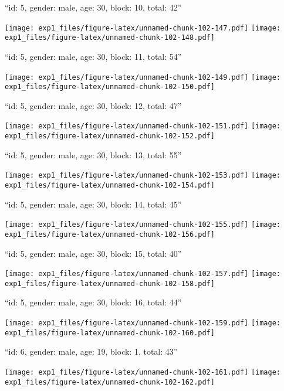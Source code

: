 \documentclass[11pt,,]{article}
\begin{document}
\newpage
[1] 

``id: 5, gender: male, age: 30, block: 10, total: 42''

\texttt{[image: exp1\_files/figure-latex/unnamed-chunk-102-147.pdf]}
\texttt{[image: exp1\_files/figure-latex/unnamed-chunk-102-148.pdf]}

\newpage
[1] 

``id: 5, gender: male, age: 30, block: 11, total: 54''

\texttt{[image: exp1\_files/figure-latex/unnamed-chunk-102-149.pdf]}
\texttt{[image: exp1\_files/figure-latex/unnamed-chunk-102-150.pdf]}

\newpage
[1] 

``id: 5, gender: male, age: 30, block: 12, total: 47''

\texttt{[image: exp1\_files/figure-latex/unnamed-chunk-102-151.pdf]}
\texttt{[image: exp1\_files/figure-latex/unnamed-chunk-102-152.pdf]}

\newpage
[1] 

``id: 5, gender: male, age: 30, block: 13, total: 55''

\texttt{[image: exp1\_files/figure-latex/unnamed-chunk-102-153.pdf]}
\texttt{[image: exp1\_files/figure-latex/unnamed-chunk-102-154.pdf]}

\newpage
[1] 

``id: 5, gender: male, age: 30, block: 14, total: 45''

\texttt{[image: exp1\_files/figure-latex/unnamed-chunk-102-155.pdf]}
\texttt{[image: exp1\_files/figure-latex/unnamed-chunk-102-156.pdf]}

\newpage
[1] 

``id: 5, gender: male, age: 30, block: 15, total: 40''

\texttt{[image: exp1\_files/figure-latex/unnamed-chunk-102-157.pdf]}
\texttt{[image: exp1\_files/figure-latex/unnamed-chunk-102-158.pdf]}

\newpage
[1] 

``id: 5, gender: male, age: 30, block: 16, total: 44''

\texttt{[image: exp1\_files/figure-latex/unnamed-chunk-102-159.pdf]}
\texttt{[image: exp1\_files/figure-latex/unnamed-chunk-102-160.pdf]}

\newpage
[1] 

``id: 6, gender: male, age: 19, block: 1, total: 43''

\texttt{[image: exp1\_files/figure-latex/unnamed-chunk-102-161.pdf]}
\texttt{[image: exp1\_files/figure-latex/unnamed-chunk-102-162.pdf]}
\end{document}
